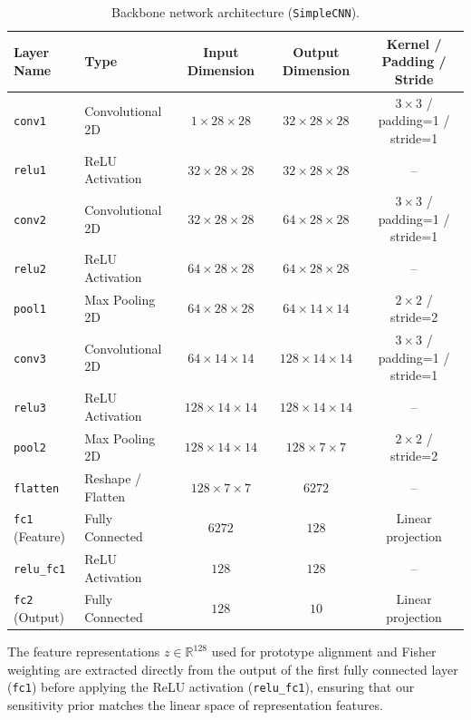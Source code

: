 \documentclass{article}
\theoremstyle{plain}
\theoremstyle{definition}
\theoremstyle{remark}
\begin{document}
\begin{table}[h]
\centering
\caption{Backbone network architecture (\texttt{SimpleCNN}).}
\label{tab:architecture_specs}
\vskip 0.1in
\begin{tabular}{llccc}
\toprule
\textbf{Layer Name} & \textbf{Type} & \textbf{Input Dimension} & \textbf{Output Dimension} & \textbf{Kernel / Padding / Stride} \\
\midrule
\texttt{conv1} & Convolutional 2D & $1 \times 28 \times 28$ & $32 \times 28 \times 28$ & $3 \times 3$ / padding=1 / stride=1 \\
\texttt{relu1} & ReLU Activation & $32 \times 28 \times 28$ & $32 \times 28 \times 28$ & -- \\
\texttt{conv2} & Convolutional 2D & $32 \times 28 \times 28$ & $64 \times 28 \times 28$ & $3 \times 3$ / padding=1 / stride=1 \\
\texttt{relu2} & ReLU Activation & $64 \times 28 \times 28$ & $64 \times 28 \times 28$ & -- \\
\texttt{pool1} & Max Pooling 2D & $64 \times 28 \times 28$ & $64 \times 14 \times 14$ & $2 \times 2$ / stride=2 \\
\texttt{conv3} & Convolutional 2D & $64 \times 14 \times 14$ & $128 \times 14 \times 14$ & $3 \times 3$ / padding=1 / stride=1 \\
\texttt{relu3} & ReLU Activation & $128 \times 14 \times 14$ & $128 \times 14 \times 14$ & -- \\
\texttt{pool2} & Max Pooling 2D & $128 \times 14 \times 14$ & $128 \times 7 \times 7$ & $2 \times 2$ / stride=2 \\
\texttt{flatten} & Reshape / Flatten & $128 \times 7 \times 7$ & $6272$ & -- \\
\texttt{fc1} (Feature) & Fully Connected & $6272$ & $128$ & Linear projection \\
\texttt{relu\_fc1} & ReLU Activation & $128$ & $128$ & -- \\
\texttt{fc2} (Output) & Fully Connected & $128$ & $10$ & Linear projection \\
\bottomrule
\end{tabular}
\end{table}

The feature representations $z \in \mathbb{R}^{128}$ used for prototype alignment and Fisher weighting are extracted directly from the output of the first fully connected layer (\texttt{fc1}) before applying the ReLU activation (\texttt{relu\_fc1}), ensuring that our sensitivity prior matches the linear space of representation features.
\end{document}
